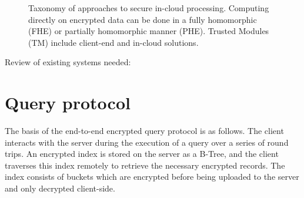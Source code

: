\documentclass[notitlepage]{revtex4-1}
\begin{document}
\begin{figure}
	\begin{center}
	\end{center}
  \caption{Taxonomy of approaches to secure in-cloud processing.
           Computing directly on encrypted data can be done in a fully homomorphic (FHE) or partially homomorphic manner (PHE).
           Trusted Modules (TM) include client-end and in-cloud solutions.}
	\label{fig:taxonomy}
\end{figure}

Review of existing systems needed:~\cite{cipherbase}~\cite{cryptdb}~\cite{gentry}~\cite{smart}


\section{Query protocol}

The basis of the end-to-end encrypted query protocol is as follows.
The client interacts with the server during the execution of a query over a series of round trips.
An encrypted index is stored on the server as a B-Tree, and the client traverses this index remotely to retrieve the necessary encrypted records.
The index consists of buckets which are encrypted before being uploaded to the server and only decrypted client-side.
\end{document}
